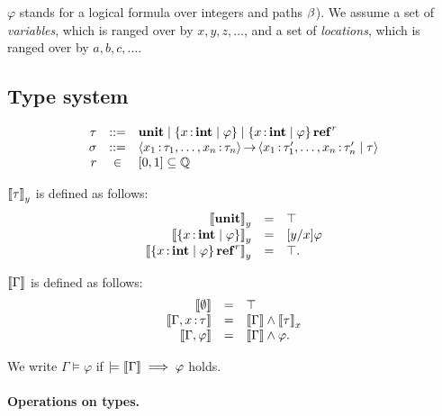 \documentclass[runningheads]{llncs}
\begin{document}
\(\varphi\) stands for a logical formula over integers and paths $\beta$).
We assume a set of \emph{variables}, which is ranged over by $x,y,z,\dots$, and a set of \emph{locations}, which is ranged over by $a,b,c,\dots$.

\subsection{Type system}

\[
\begin{array}{rcl}
  \tau &::=& \mathbf{unit} \mid \left\{{x \operatorname{:} \mathbf{int} \mid \varphi}\right\} \mid \left\{{x \operatorname{:} \mathbf{int} \mid \varphi}\right\} \operatorname{\mathbf{ref}}^{r}\\
  \sigma &::=& \left\langle{x_1\operatorname{:}\tau_1,\dots,x_n\operatorname{:}\tau_n}\right\rangle\operatorname{\rightarrow}\left\langle{x_1\operatorname{:}\tau_1',\dots,x_n\operatorname{:}\tau_n' \mid \tau}\right\rangle\\
  r &\in& [0,1] \subseteq \mathbb{Q}
\end{array}
\]
\begin{definition}
  $\left\llbracket{\tau}\right\rrbracket_y$ is defined as follows:
  \[
    \begin{array}{rcl}
      \left\llbracket{\mathbf{unit}}\right\rrbracket_y &=& \top\\
      \left\llbracket{\left\{{x \operatorname{:}\mathbf{int}\mid \varphi}\right\}}\right\rrbracket_y &=& [y/x]\varphi\\
      \left\llbracket{\left\{{x \operatorname{:}\mathbf{int}\mid \varphi}\right\} \operatorname{\mathbf{ref}}^{r}}\right\rrbracket_y &=& \top.
    \end{array}
  \]
\end{definition}

\begin{definition}
  $\left\llbracket{\Gamma}\right\rrbracket$ is defined as follows:
  \[
    \begin{array}{rcl}
      \left\llbracket{\emptyset}\right\rrbracket &=& \top\\
      \left\llbracket{\Gamma, x\operatorname{:}\tau}\right\rrbracket &=& \left\llbracket{\Gamma}\right\rrbracket \land \left\llbracket{\tau}\right\rrbracket_x \\
      \left\llbracket{\Gamma, \varphi}\right\rrbracket & = & \left\llbracket{\Gamma}\right\rrbracket \land \varphi.
    \end{array}
  \]
\end{definition}

\begin{definition}
  We write $\Gamma \models \varphi$ if $\models \left\llbracket{\Gamma}\right\rrbracket \implies \varphi$ holds.
\end{definition}

\paragraph{Operations on types.}
\end{document}
